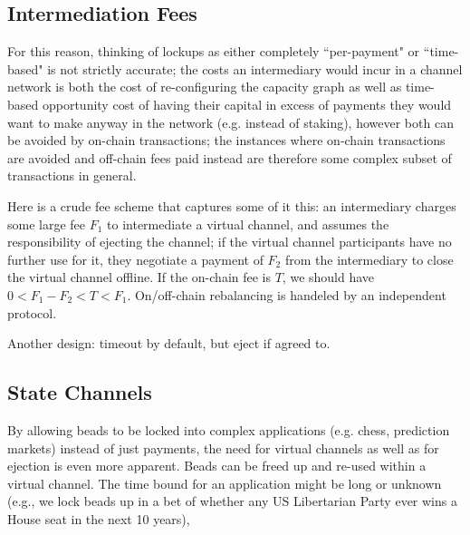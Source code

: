\documentclass{article}
\begin{document}
\begin{figure}[H]
    \centering
\end{figure}

\subsection*{Intermediation Fees}

For this reason, thinking of lockups as either completely ``per-payment" or ``time-based" is not strictly accurate; the costs an intermediary would incur in a channel network is both the cost of re-configuring the capacity graph as well as time-based opportunity cost of having their capital in excess of payments they would want to make anyway in the network (e.g. instead of staking), however both can be avoided by on-chain transactions; the instances where on-chain transactions are avoided and off-chain fees paid instead are therefore some complex subset of transactions in general.

Here is a crude fee scheme that captures some of it this: an intermediary charges some large fee $F_1$ to intermediate a virtual channel, and assumes the responsibility of ejecting the channel; if the virtual channel participants have no further use for it, they negotiate a payment of $F_2$ from the intermediary to close the virtual channel offline. If the on-chain fee is $T$, we should have $0 < F_1 - F_2 < T < F_1$. On/off-chain rebalancing is handeled by an independent protocol.

Another design: timeout by default, but eject if agreed to.

\subsection*{State Channels}

By allowing beads to be locked into complex applications (e.g. chess, prediction markets) instead of just payments, the need for virtual channels as well as for ejection is even more apparent. Beads can be freed up and re-used within a virtual channel. The time bound for an application might be long or unknown (e.g., we lock beads up in a bet of whether any US Libertarian Party ever wins a House seat in the next 10 years),
\end{document}
